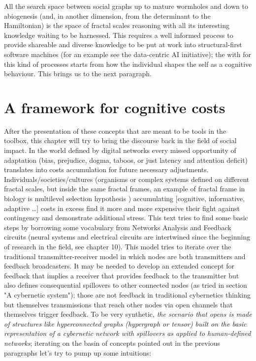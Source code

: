 \documentclass[14pt,a4paper]{extarticle}
\begin{document}
\newline
\hspace*{15mm}All the search space between social graphs up to mature wormholes and down to abiogenesis (and, in another dimension, from the determinant to the Hamiltonian) is the space of fractal scales reasoning with all its interesting knowledge waiting to be harnessed. This requires a well informed process to provide shareable and diverse knowledge to be put at work into structural-first software machines (for an example see the data-centric AI initiative); the with for this kind of processes starts from how the individual shapes the self as a cognitive behaviour. This brings us to the next paragraph.

\section*{A framework for cognitive costs}
\label{sec:costs}%

\hspace*{15mm}After the presentation of these concepts that are meant to be tools in the toolbox, this chapter will try to bring the discourse back in the field of social impact. In the world defined by digital networks every missed opportunity of adaptation (bias, prejudice, dogma, taboos, or just latency and attention deficit) translates into costs accumulation for future necessary adjustments.
\newline
\hspace*{15mm}Individuals/societies/cultures (organisms or complex systems defined on different fractal scales, but inside the same fractal frames, an example of fractal frame in biology is multilevel selection hypothesis \cite{doi:10.1111,10.1086/286046}) accumulating [cognitive, informative, adaptive …] costs in excess find it more and more expensive their fight against contingency and demonstrate additional stress. This text tries to find some basic steps by borrowing some vocabulary from Networks Analysis \cite{BRANDESnetwork} and Feedback circuits (neural systems and electrical circuits are intertwined since the beginning of research in the field, see \cite{heims1980john} chapter 10).
\newline
This model tries to iterate over the traditional transmitter-receiver model in which nodes are both transmitters and feedback broadcasters. It may be needed to develop an extended concept for feedback that implies a receiver that provides feedback to the transmitter but also defines consequential spillovers to other connected nodes (as tried in section "A cybernetic system"); those are not feedback in traditional cybernetics thinking but themselves transmissions that reach other nodes via open channels that themselves trigger feedback. To be very synthetic, \textit{the scenario that opens is made of structures like hyperconnected graphs (hypergraph or tensor) built on the basic representation of a cybernetic network with spillovers as applied to human-defined networks}; iterating on the basin of concepts pointed out in the previous paragraphs let’s try to pump up some intuitions:
\end{document}
